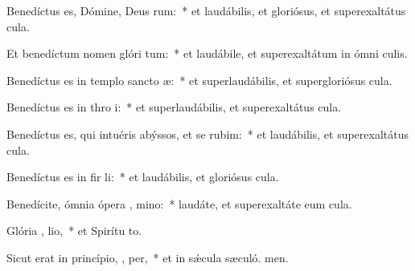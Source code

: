 \item Benedíctus es, Dómine, Deus  rum:~* et laudábilis, et gloriósus, et superexaltátus  cula.

\item Et benedíctum nomen glóri  tum:~* et laudábile, et superexaltátum in ómni culis.

\item Benedíctus es in templo sancto  æ:~* et superlaudábilis, et supergloriósus  cula.

\item Benedíctus es in thro  i:~* et superlaudábilis, et superexaltátus  cula.

\item Benedíctus es, qui intuéris abýssos, et se  rubim:~* et laudábilis, et superexaltátus  cula.

\item Benedíctus es in fir li:~* et laudábilis, et gloriósus  cula.

\item Benedícite, ómnia ópera , mino:~* laudáte, et superexaltáte eum  cula.

\item Glória ,  lio,~* et Spirítu to.

\item Sicut erat in princípio,  ,  per,~* et in sǽcula sæculó. men.